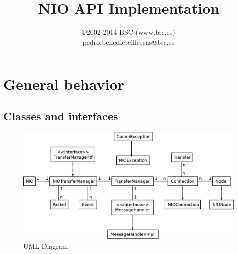 \documentclass[11pt]{article}
\title{\textbf{NIO API Implementation}}
\author{\copyright 2002-2014 BSC (www.bsc.es)\\pedro.benedicteillescas@bsc.es}
\date{}
\begin{document}
\maketitle
\tableofcontents
\listoffigures
\clearpage

\section{General behavior}
\label{sec:general_behavior}

	\subsection{Classes and interfaces}
		\begin{figure}[H]
		\centering
		\includegraphics[width=160mm]{img/drawing8.eps}
		\caption[UML Diagram]{UML Diagram}
		\label{drawing8}
		\end{figure}
\end{document}

